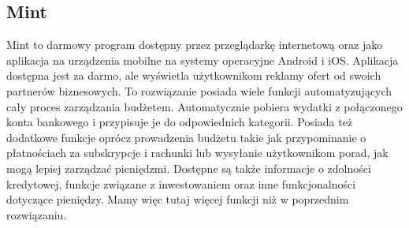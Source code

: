 \documentclass[shortabstract,inz]{iithesis}
\begin{document}
\subsection{Mint}
Mint \cite{mint} to darmowy program dostępny przez przeglądarkę internetową oraz jako aplikacja na urządzenia mobilne na systemy operacyjne Android i iOS. Aplikacja dostępna jest za darmo, ale wyświetla użytkownikom reklamy ofert od swoich partnerów biznesowych. To rozwiązanie posiada wiele funkcji automatyzujących cały proces zarządzania budżetem. Automatycznie pobiera wydatki z połączonego konta bankowego i przypisuje je do odpowiednich kategorii. Posiada też dodatkowe funkcje oprócz prowadzenia budżetu takie jak przypominanie o płatnościach za subskrypcje i rachunki lub wysyłanie użytkownikom porad, jak mogą lepiej zarządzać pieniędzmi. Dostępne są także informacje o zdolności kredytowej, funkcje związane z inwestowaniem oraz inne funkcjonalności dotyczące pieniędzy. Mamy więc tutaj więcej funkcji niż w poprzednim rozwiązaniu.
\end{document}
